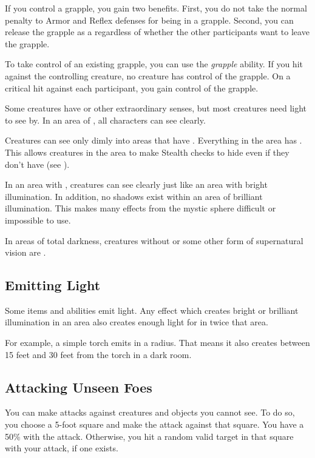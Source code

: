       If you control a grapple, you gain two benefits.
      First, you do not take the normal  penalty to Armor and Reflex defenses for being in a grapple.
      Second, you can release the grapple as a  regardless of whether the other participants want to leave the grapple.

      To take control of an existing grapple, you can use the \textit{grapple} ability.
      If you hit against the controlling creature, no creature has control of the grapple.
      On a critical hit against each participant, you gain control of the grapple.


  Some creatures have  or other extraordinary senses, but most creatures need light to see by.
  In an area of , all characters can see clearly.

  Creatures can see only dimly into areas that have .
  Everything in the area has .
  This allows creatures in the area to make Stealth checks to hide even if they don't have  (see ).

  In an area with , creatures can see clearly just like an area with bright illumination.
  In addition, no shadows exist within an area of brilliant illumination.
  This makes many effects from the  mystic sphere difficult or impossible to use.

  In areas of total darkness, creatures without  or some other form of supernatural vision are \blinded.

  \subsection{Emitting Light}
    Some items and abilities emit light.
    Any effect which creates bright or brilliant illumination in an area also creates enough light for  in twice that area.

    For example, a simple torch emits  in a \smallarea radius.
    That means it also creates  between 15 feet and 30 feet from the torch in a dark room.

  \subsection{Attacking Unseen Foes}
    You can make  attacks against creatures and objects you cannot see.
    To do so, you choose a 5-foot square and make the attack against that square.
    You have a 50\%  with the attack.
    Otherwise, you hit a random valid target in that square with your attack, if one exists.

